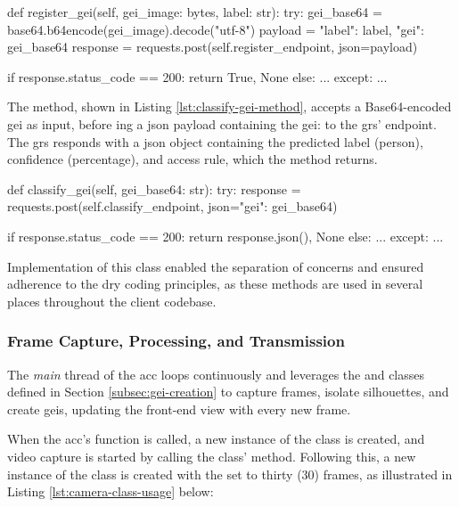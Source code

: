 \begin{code}
def register_gei(self, gei_image: bytes, label: str):
	try:
		gei_base64 = base64.b64encode(gei_image).decode("utf-8")
		payload = {"label": label, "gei": gei_base64}
		response = requests.post(self.register_endpoint, json=payload)

		if response.status_code == 200:
			return True, None
		else:
			...
	except: 
		...
\end{code}
\label{lst:register-gei-method} \vspace{10pt}

The  method, shown in Listing \ref{lst:classify-gei-method}, accepts a Base64-encoded \ac{gei} as input, before ing a \ac{json} payload containing the \ac{gei}:
 to the \ac{grs}'  endpoint. The \ac{grs} responds with a \ac{json} object containing the predicted label (person), confidence (percentage), and access rule, which the method returns.

\begin{code}
def classify_gei(self, gei_base64: str):
	try:
		response = requests.post(self.classify_endpoint, json={"gei": gei_base64})
		
		if response.status_code == 200:
			return response.json(), None
		else:
			...
	except:
		...
\end{code}
\label{lst:classify-gei-method} \vspace{10pt}

Implementation of this class enabled the separation of concerns and ensured adherence to the \ac{dry} coding principles,
as these methods are used in several places throughout the client codebase.

\subsubsection{Frame Capture, Processing, and Transmission}
\label{subsubsec:frame-capture-processing-and-transmission}

The \textit{main} thread of the \ac{acc} loops continuously and leverages the  and  classes defined in Section \ref{subsec:gei-creation} to capture frames,
isolate silhouettes, and create \acp{gei}, updating the front-end view with every new frame.

When the \ac{acc}'s  function is called, a new instance of the  class is created,
and video capture is started by calling the class'  method.
Following this, a new instance of the  class is created with the  set to thirty (30) frames, as illustrated in Listing \ref{lst:camera-class-usage} below:


